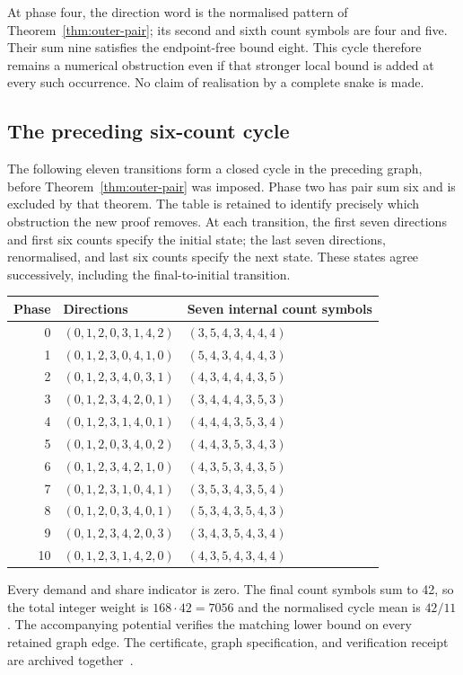 \documentclass[11pt,a4paper]{article}
\theoremstyle{definition}
\theoremstyle{remark}
\begin{document}
At phase four, the direction word is the normalised pattern of Theorem~\ref{thm:outer-pair}; its second and sixth count symbols are four and five. Their sum nine satisfies the endpoint-free bound eight. This cycle therefore remains a numerical obstruction even if that stronger local bound is added at every such occurrence. No claim of realisation by a complete snake is made.

\subsection{The preceding six-count cycle}\label{app:six-count-cycle}
The following eleven transitions form a closed cycle in the preceding graph, before Theorem~\ref{thm:outer-pair} was imposed. Phase two has pair sum six and is excluded by that theorem. The table is retained to identify precisely which obstruction the new proof removes. At each transition, the first seven directions and first six counts specify the initial state; the last seven directions, renormalised, and last six counts specify the next state. These states agree successively, including the final-to-initial transition.
\begin{center}
\begin{tabular}{rll}
\toprule
Phase & Directions & Seven internal count symbols\\\midrule
0 & $(0,1,2,0,3,1,4,2)$ & $(3,5,4,3,4,4,4)$\\
1 & $(0,1,2,3,0,4,1,0)$ & $(5,4,3,4,4,4,3)$\\
2 & $(0,1,2,3,4,0,3,1)$ & $(4,3,4,4,4,3,5)$\\
3 & $(0,1,2,3,4,2,0,1)$ & $(3,4,4,4,3,5,3)$\\
4 & $(0,1,2,3,1,4,0,1)$ & $(4,4,4,3,5,3,4)$\\
5 & $(0,1,2,0,3,4,0,2)$ & $(4,4,3,5,3,4,3)$\\
6 & $(0,1,2,3,4,2,1,0)$ & $(4,3,5,3,4,3,5)$\\
7 & $(0,1,2,3,1,0,4,1)$ & $(3,5,3,4,3,5,4)$\\
8 & $(0,1,2,0,3,4,0,1)$ & $(5,3,4,3,5,4,3)$\\
9 & $(0,1,2,3,4,2,0,3)$ & $(3,4,3,5,4,3,4)$\\
10 & $(0,1,2,3,1,4,2,0)$ & $(4,3,5,4,3,4,4)$\\
\bottomrule
\end{tabular}
\end{center}
Every demand and share indicator is zero. The final count symbols sum to 42, so the total integer weight is $168\cdot42=7056$ and the normalised cycle mean is $42/11$. The accompanying potential verifies the matching lower bound on every retained graph edge. The certificate, graph specification, and verification receipt are archived together~\cite{sixcountarchive}.
\end{document}
